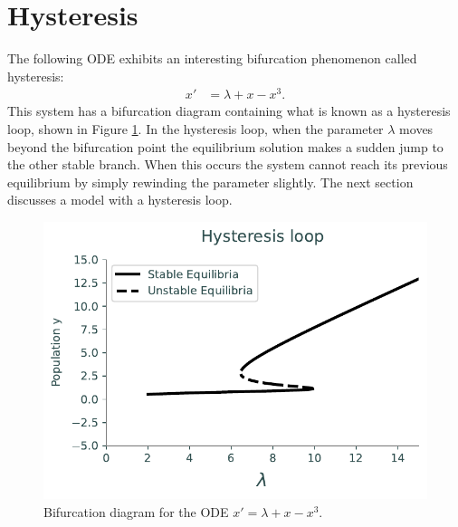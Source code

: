 \section*{Hysteresis}

The following ODE exhibits an interesting bifurcation phenomenon called hysteresis:
\begin{align*}
	x' &= \lambda + x - x^3.
\end{align*}
This system has a bifurcation diagram containing what is known as a hysteresis loop, shown in Figure \ref{bifurcation:hysteresis}.
In the hysteresis loop, when the parameter $\lambda$ moves beyond the bifurcation point the equilibrium solution makes a sudden jump to the other stable branch.
When this occurs the system cannot reach its previous equilibrium by simply rewinding the parameter slightly. The next section discusses a model with a hysteresis loop.

\begin{figure}
\centering
\includegraphics[width=\textwidth]{figures/HysteresisBifurcation.pdf}
\caption{Bifurcation diagram for the ODE $x' = \lambda + x - x^3$. }
\label{bifurcation:hysteresis}
\end{figure}

